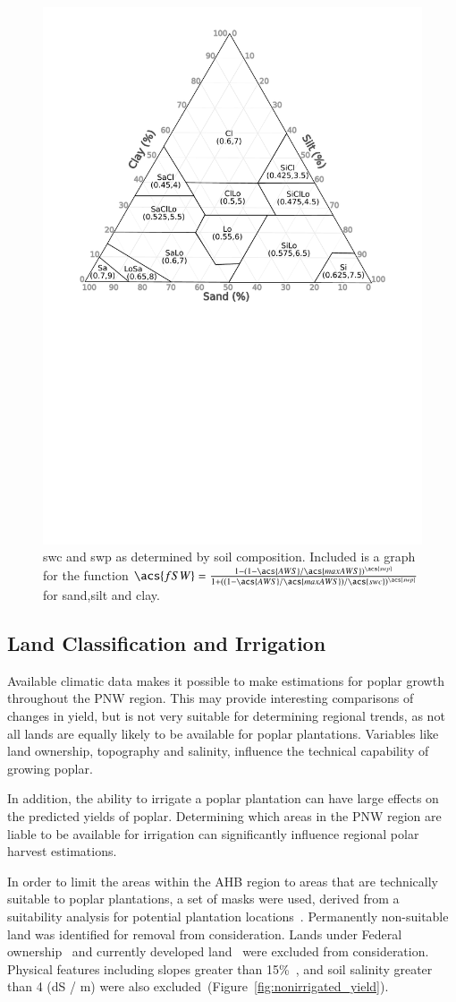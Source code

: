 \documentclass[preprint,12pt]{elsarticle}
\begin{document}
\begin{figure}
  \centering
  \includegraphics[width=0.45\linewidth]{soil_triangle}
  
  \caption{\acs{swc} and \acs{swp} as determined by soil composition.  Included is a graph for the function $\acs{fSW} = \frac{1-(1-\acs{AWS}/\acs{maxAWS})^{\acs{swp}}}{1+((1-\acs{AWS}/\acs{maxAWS})/\acs{swc})^{\acs{swp}}}$ for sand,silt and clay. }
  \label{fig:soil-triangle}
\end{figure}

\subsection{Land Classification and Irrigation}
\label{sec:land}

Available climatic data makes it possible to make estimations for
poplar growth throughout the \ac{PNW} region.  This may provide
interesting comparisons of changes in yield, but is not very suitable
for determining regional trends, as not all lands are equally likely
to be available for poplar plantations.  Variables like land
ownership, topography and salinity, influence the technical capability
of growing poplar.  

In addition, the ability to irrigate a poplar plantation can have
large effects on the predicted yields of poplar.  Determining which
areas in the \ac{PNW} region are liable to be available for irrigation
can significantly influence regional polar harvest estimations.  

In order to limit the areas within the \ac{AHB} region to areas that
are technically suitable to poplar plantations, a set of masks were
used, derived from a suitability analysis for potential plantation
locations~\cite{Cooke2014}. Permanently non-suitable land was
identified for removal from consideration. Lands under Federal
ownership~\cite{NationalAtlasoftheUnitedStates201} and currently
developed land~\cite{nlcd2011} were excluded from consideration.
Physical features including slopes greater than 15\%~\cite{Gesch2007},
and soil salinity greater than 4 (dS / m) were also
excluded~(Figure~\ref{fig:nonirrigated_yield}).
\end{document}
